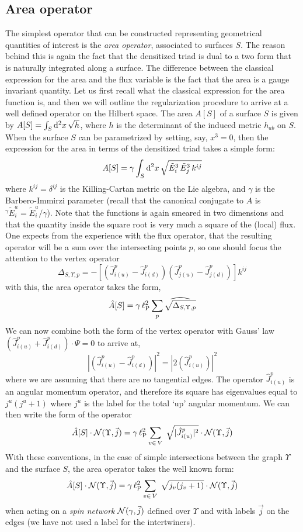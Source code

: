 \documentclass[aps,prd,tightenlines,showpacs,nofootinbib,preprint]{revtex4}
\def\be{\begin{equation}}
\def\ee{\end{equation}}
\def\d{{\rm d}}
\begin{document}
\subsection{Area operator}

The simplest operator that can be constructed representing
geometrical quantities of interest is the {\it area operator},
associated to surfaces $S$. The reason behind this is again the
fact that the densitized triad is dual to a two form that is
naturally integrated along  a surface. The difference between the
classical expression for the area and the flux variable is the
fact that the area is a gauge invariant quantity. Let us first
recall what the classical expression for the area function is, and
then we will outline the regularization procedure to arrive at a
well defined operator on the Hilbert space. The area $A[S]$ of a
surface $S$ is given by $A[S]=\int_S\d^2 x\,\sqrt{h}$, where $h$
is the determinant of the induced metric $h_{ab}$ on $S$. When the
surface $S$ can be parametrized by setting, say, $x^3=0$, then the
expression for the area in terms of the densitized triad takes a
simple form: \be A[S]=\gamma\int_S\d^2
x\,\sqrt{\tilde{E}^3_i\,\tilde{E}^3_j\,k^{ij}} \ee where
$k^{ij}=\delta^{ij}$ is the Killing-Cartan metric on the Lie
algebra, and $\gamma$ is the Barbero-Immirzi parameter (recall
that the canonical conjugate to $A$ is
${}^\gamma\!\tilde{E}^a_i=\tilde{E}^a_i/\gamma$). Note that the
functions is again smeared in two dimensions and that the quantity
inside the square root is very much a square of the (local) flux.
One expects from the experience with the flux operator, that the
resulting operator will be a sum over the intersecting points $p$,
so one should focus the attention to the vertex operator
$$\Delta_{S,\Upsilon,p}=-\left[(\hat{J}^{p}_{i(u)}-
\hat{J}^{p}_{i(d)})(\hat{J}^{p}_{j(u)}-
\hat{J}^{p}_{j(d)})\right]k^{ij}$$
with this, the area operator takes the form,
\be
\hat{A}[S]=\gamma\,\ell^2_{\rm P}\sum_p
\widehat{\sqrt{\Delta_{S,\Upsilon,p}}}
\ee
We can now combine both the form of the vertex operator with Gauss' law
$(\hat{J}^{p}_{i(u)}+ \hat{J}^{p}_{i(d)})\cdot \Psi=0$ to arrive at,
%
\be
|(\hat{J}^{p}_{i(u)} - \hat{J}^{p}_{i(d)})|^2 = |2(\hat{J}^{p}_{i(u)})|^2
\ee
%
where we are assuming that there are no tangential edges. The
operator $\hat{J}^{p}_{i(u)}$ is an angular momentum operator, and
therefore its square has eigenvalues equal to $j^u(j^u+1)$ where
$j^u$ is the label for the total `up' angular momentum. We can
then write the form of the operator \be \hat{A}[S]\cdot{\cal
N}(\Upsilon,\vec{j})=\gamma\,\ell^2_{\rm P}
 \sum_{v\in \,V}
 \;\sqrt{|\hat{J}^{p}_{i(u)}|^2}\cdot
{\cal N}(\Upsilon,\vec{j})
\ee
%
With these conventions, in the case of  simple intersections
between the graph $\Upsilon$ and the surface $S$, the area
operator takes the well known form:
\[
\hat{A}[S]\cdot{\cal N}(\Upsilon,\vec{j})=\gamma\,\ell^2_{\rm P}
\sum_{v\in \,V}
 \;\sqrt{j_v(j_v+1)}\cdot
{\cal N}(\Upsilon,\vec{j})
\]
when acting on a {\it spin network} ${\cal N}(\gamma,\vec{j})$
defined over $\Upsilon$ and with labels $\vec{j}$ on the edges (we
have not used a label for the intertwiners).
\end{document}
